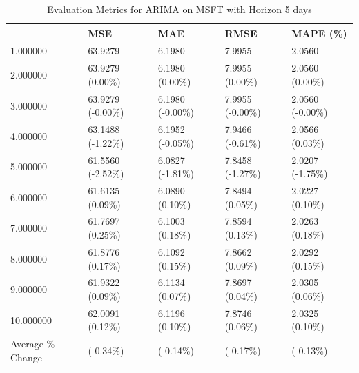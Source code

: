 \begin{table}
\caption{Evaluation Metrics for ARIMA on MSFT with Horizon 5 days}
\label{tab:arima_MSFT_h5_metrics}
\begin{tabular}{lllll}
\toprule
 & MSE & MAE & RMSE & MAPE (\%) \\
\midrule
1.000000 & 63.9279 & 6.1980 & 7.9955 & 2.0560 \\
2.000000 & 63.9279 (0.00\%) & 6.1980 (0.00\%) & 7.9955 (0.00\%) & 2.0560 (0.00\%) \\
3.000000 & 63.9279 (-0.00\%) & 6.1980 (-0.00\%) & 7.9955 (-0.00\%) & 2.0560 (-0.00\%) \\
4.000000 & 63.1488 (-1.22\%) & 6.1952 (-0.05\%) & 7.9466 (-0.61\%) & 2.0566 (0.03\%) \\
5.000000 & 61.5560 (-2.52\%) & 6.0827 (-1.81\%) & 7.8458 (-1.27\%) & 2.0207 (-1.75\%) \\
6.000000 & 61.6135 (0.09\%) & 6.0890 (0.10\%) & 7.8494 (0.05\%) & 2.0227 (0.10\%) \\
7.000000 & 61.7697 (0.25\%) & 6.1003 (0.18\%) & 7.8594 (0.13\%) & 2.0263 (0.18\%) \\
8.000000 & 61.8776 (0.17\%) & 6.1092 (0.15\%) & 7.8662 (0.09\%) & 2.0292 (0.15\%) \\
9.000000 & 61.9322 (0.09\%) & 6.1134 (0.07\%) & 7.8697 (0.04\%) & 2.0305 (0.06\%) \\
10.000000 & 62.0091 (0.12\%) & 6.1196 (0.10\%) & 7.8746 (0.06\%) & 2.0325 (0.10\%) \\
Average \% Change & (-0.34\%) & (-0.14\%) & (-0.17\%) & (-0.13\%) \\
\bottomrule
\end{tabular}
\end{table}
